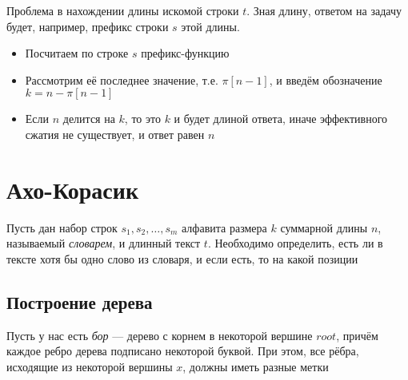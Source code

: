 \documentclass[a4paper]{article}
\begin{document}
Проблема в нахождении длины искомой строки $t$. Зная длину, ответом на задачу будет, например, префикс строки $s$ этой длины.
\begin{itemize}
    \item Посчитаем по строке $s$ префикс-функцию
    \item Рассмотрим её последнее значение, т.е. $\pi[n-1]$, и введём обозначение $k = n - \pi[n-1]$
    \item Если $n$ делится на $k$, то это $k$ и будет длиной ответа, иначе эффективного сжатия не существует, и ответ равен $n$
\end{itemize}




\newpage
\section{Ахо-Корасик}
Пусть дан набор строк $s_1, s_2, \ldots, s_m$ алфавита размера $k$ суммарной длины $n$, называемый \textit{словарем}, и длинный текст $t$. Необходимо определить, есть ли в тексте хотя бы одно слово из словаря, и если есть, то на какой позиции

\subsection{Построение дерева}
Пусть у нас есть \textit{бор} — дерево с корнем в некоторой вершине $root$, причём каждое ребро дерева подписано некоторой буквой. При этом, все рёбра, исходящие из некоторой вершины $x$, должны иметь разные метки
\end{document}
